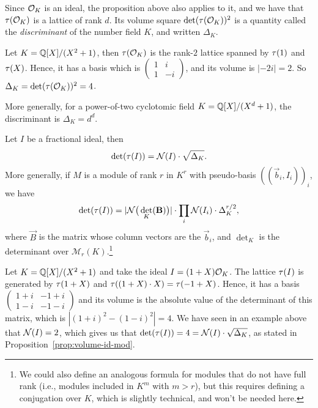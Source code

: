 Since $\mathcal{O}_K$ is an ideal, the proposition above also applies to it, and we have that $\tau(\mathcal{O}_K)$ is a lattice of rank $d$. Its volume square $\det(\tau(\mathcal{O}_K))^2$ is a quantity called the \textit{discriminant} of the number field $K$, and written $\Delta_K$.

\begin{example}
Let $K = \mathbb{Q}[X]/(X^2+1)$, then $\tau(\mathcal{O}_K)$ is the rank-$2$ lattice spanned by $\tau(1)$ and $\tau(X)$. Hence, it has a basis which is $\begin{pmatrix}
1 & i \\
1 & -i
\end{pmatrix}$, and its volume is $|-2i| = 2$. So $\Delta_K = \det(\tau(\mathcal{O}_K))^2 = 4$.

More generally, for a power-of-two cyclotomic field $K = \mathbb{Q}[X]/(X^d+1)$, the discriminant is $\Delta_K = d^d$.
\end{example}

\begin{proposition}
\label{prop:volume-id-mod}
Let $I$ be a fractional ideal, then
\[ \det(\tau(I)) = \mathcal{N}(I) \cdot \sqrt{\Delta_K}.\]
More generally, if $M$ is a module of rank $r$ in $K^r$ with pseudo-basis $((\vec b_i, I_i))_i$, we have
\[\det(\tau(I)) = |\mathcal{N}\big(\det_K(\mathbf B)\big)| \cdot \prod_i \mathcal{N}(I_i) \cdot \Delta_K^{r/2},\]
where $\vec B$ is the matrix whose column vectors are the $\vec b_i$, and $\det_K$ is the determinant over $\mathcal{M}_r(K)$.\footnote{We could also define an analogous formula for modules that do not have full rank (i.e., modules included in $K^m$ with $m > r$), but this requires defining a conjugation over $K$, which is slightly technical, and won't be needed here.}
\end{proposition}

\begin{example}
Let $K = \mathbb{Q}[X]/(X^2+1)$ and take the ideal $I = (1+X) \mathcal{O}_K$. The lattice $\tau(I)$ is generated by $\tau(1+X)$ and $\tau((1+X)\cdot X) = \tau(-1+X)$. Hence, it has a basis $\begin{pmatrix}
1+i & -1+i \\ 1-i & -1-i
\end{pmatrix}$ and its volume is the absolute value of the determinant of this matrix, which is $|(1+i)^2 - (1-i)^2| = 4$. We have seen in an example above that $\mathcal{N}(I) = 2$, which gives us that $\det(\tau(I)) = 4 = \mathcal{N}(I) \cdot \sqrt{\Delta_K}$, as stated in Proposition~\ref{prop:volume-id-mod}.
\end{example}

